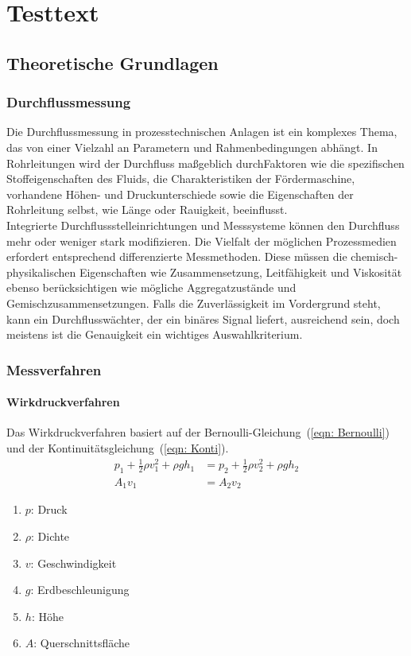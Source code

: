 \chapter{Testtext}
\section{Theoretische Grundlagen}
\subsection{Durchflussmessung}

Die Durchflussmessung in prozesstechnischen Anlagen ist ein komplexes Thema, das von einer Vielzahl an Parametern und Rahmenbedingungen abhängt. In Rohrleitungen wird der Durchfluss maßgeblich durchFaktoren wie die spezifischen Stoffeigenschaften des Fluids, die Charakteristiken der Fördermaschine, vorhandene Höhen- und Druckunterschiede sowie die Eigenschaften der Rohrleitung selbst, wie Länge oder Rauigkeit, beeinflusst.\\
Integrierte Durchflussstelleinrichtungen und Messsysteme können den Durchfluss mehr oder weniger stark modifizieren. Die Vielfalt der möglichen Prozessmedien erfordert entsprechend differenzierte Messmethoden. Diese müssen die chemisch-physikalischen Eigenschaften wie Zusammensetzung, Leitfähigkeit und Viskosität ebenso berücksichtigen wie mögliche Aggregatzustände und Gemischzusammensetzungen. Falls die Zuverlässigkeit im Vordergrund steht, kann ein Durchflusswächter, der ein binäres Signal liefert, ausreichend sein, doch meistens ist die Genauigkeit ein wichtiges Auswahlkriterium.

\subsection{Messverfahren}
\subsubsection{Wirkdruckverfahren}

Das Wirkdruckverfahren basiert auf der Bernoulli-Gleichung~(\ref{eqn: Bernoulli}) und der Kontinuitätsgleichung~(\ref{eqn: Konti}).
\begin{align}
	\label{eqn: Bernoulli}
	p_1 + \frac{1}{2} \rho v_1^2 + \rho g h_1 &= p_2 + \frac{1}{2} \rho v_2^2 + \rho g h_2\\
	\label{eqn: Konti}
	A_1 v_1 &= A_2 v_2
\end{align}
\begin{enumerate}[]
	\item[] $p$: Druck
	\item[] $\rho$: Dichte
	\item[] $v$: Geschwindigkeit
	\item[] $g$: Erdbeschleunigung
	\item[] $h$: Höhe
	\item[] $A$: Querschnittsfläche
\end{enumerate}

